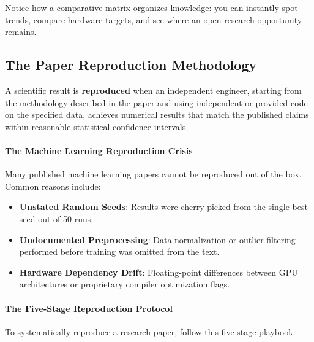 Notice how a comparative matrix organizes knowledge: you can instantly spot trends, compare hardware targets, and see where an open research opportunity remains.

\subsection{The Paper Reproduction Methodology}

\begin{keyidea}
A scientific result is \textbf{reproduced} when an independent engineer, starting from the methodology described in the paper and using independent or provided code on the specified data, achieves numerical results that match the published claims within reasonable statistical confidence intervals.
\end{keyidea}

\paragraph{The Machine Learning Reproduction Crisis}
Many published machine learning papers cannot be reproduced out of the box. Common reasons include:
\begin{itemize}
    \item \textbf{Unstated Random Seeds}: Results were cherry-picked from the single best seed out of 50 runs.
    \item \textbf{Undocumented Preprocessing}: Data normalization or outlier filtering performed before training was omitted from the text.
    \item \textbf{Hardware Dependency Drift}: Floating-point differences between GPU architectures or proprietary compiler optimization flags.
\end{itemize}

\paragraph{The Five-Stage Reproduction Protocol}
To systematically reproduce a research paper, follow this five-stage playbook:

